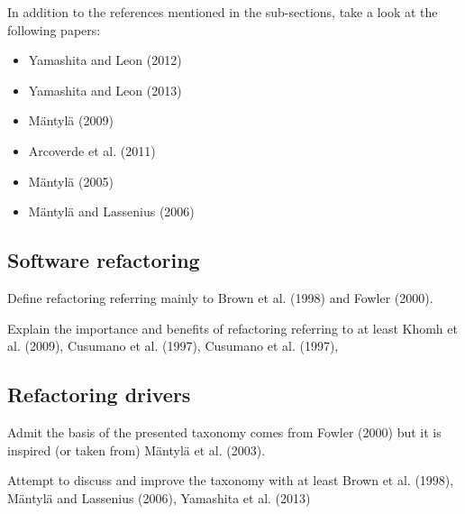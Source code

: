 In addition to the references mentioned in the sub-sections, take a look at the following papers:
\begin{itemize}
\item Yamashita and Leon (2012)
\item Yamashita and Leon (2013)
\item Mäntylä (2009)
\item Arcoverde et al. (2011)
\item Mäntylä (2005)
\item Mäntylä and Lassenius (2006)
\end{itemize}

\subsection{Software refactoring}
Define refactoring referring mainly to Brown et al. (1998) and Fowler (2000). 

Explain the importance and benefits of refactoring referring to at least Khomh et al. (2009), Cusumano et al. (1997), Cusumano et al. (1997),  

\subsection{Refactoring drivers}
Admit the basis of the presented taxonomy comes from Fowler (2000) but it is inspired (or taken from) Mäntylä et al. (2003). 

Attempt to discuss and improve the taxonomy with at least Brown et al. (1998), Mäntylä and Lassenius (2006), Yamashita et al. (2013)